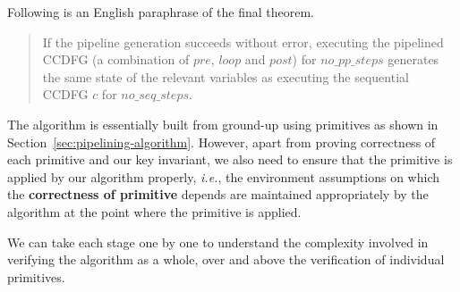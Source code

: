 Following is an English paraphrase of the final theorem.
  
\begin{quote}  
If the pipeline generation succeeds without error,
executing the pipelined CCDFG (a combination of $pre$, $loop$ and $post$) for $no\_pp\_steps$
generates the same state of the relevant variables as executing the sequential CCDFG $c$ for $no\_seq\_steps$.

\end{quote}

The algorithm is essentially built from ground-up using primitives
as shown in Section~\ref{sec:pipelining-algorithm}. However, 
apart from proving correctness of each primitive and our key 
invariant, we also need to ensure that the primitive is applied by 
our algorithm properly, {\em i.e.}, the environment
assumptions on which the {\bf correctness of primitive}
depends are maintained appropriately by the algorithm at
the point where the primitive is applied. 

We can take each stage one by one to understand the complexity involved in 
verifying the algorithm as a whole, over and above the verification of 
individual primitives.

